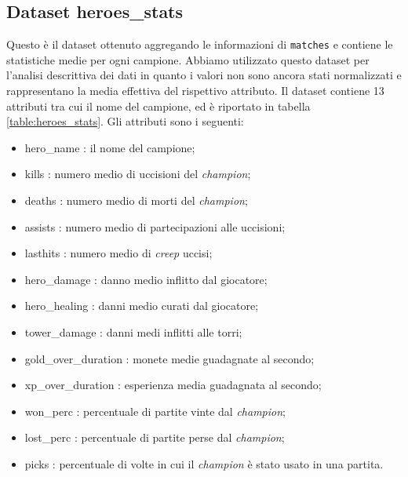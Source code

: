 \documentclass[a4paper,12pt,openany,oneside]{book}
\begin{document}
\subsection{Dataset heroes\_stats}\label{subsection:heroes_stats}
Questo è il dataset ottenuto aggregando le informazioni di \verb|matches| e contiene le statistiche medie per ogni campione. Abbiamo utilizzato questo dataset per l'analisi descrittiva dei dati in quanto i valori non sono ancora stati normalizzati e rappresentano la media effettiva del rispettivo attributo. Il dataset contiene 13 attributi tra cui il nome del campione, ed è riportato in tabella \ref{table:heroes_stats}. Gli attributi sono i seguenti: 
\begin{itemize}
	\item hero\_name : il nome del campione;
	\item kills : numero medio di uccisioni del \textit{champion};
	\item deaths : numero medio di morti del \textit{champion};
	\item assists : numero medio di partecipazioni alle uccisioni; 
	\item lasthits : numero medio di \textit{creep} uccisi;
	\item hero\_damage : danno medio inflitto dal giocatore;
	\item hero\_healing : danni medio curati dal giocatore;
	\item tower\_damage : danni medi inflitti alle torri;
	\item gold\_over\_duration : monete medie guadagnate al secondo;
	\item xp\_over\_duration : esperienza media guadagnata al secondo;
	\item won\_perc : percentuale di partite vinte dal \textit{champion};
	\item lost\_perc : percentuale di partite perse dal \textit{champion};
	\item picks : percentuale di volte in cui il \textit{champion} è stato usato in una partita.
\end{itemize}
\end{document}
